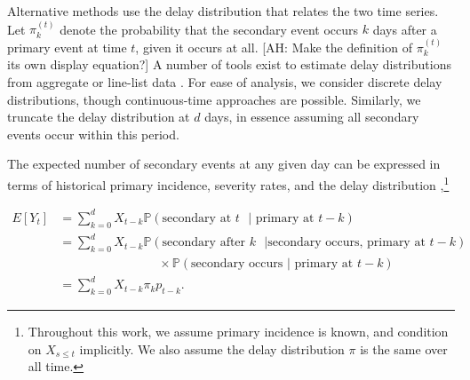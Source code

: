 \documentclass{article}
\newcommand{\ahcomment}[1]{{\color{red}[AH: #1]}}
\begin{document}
Alternative methods use the delay distribution that relates the two time series. Let $\pi_k^{(t)}$ denote the probability that the secondary event occurs $k$ days after a primary event at time $t$, given it occurs at all.  \ahcomment{Make the definition of $\pi_k^{(t)}$ its own display equation?} A number of tools exist to estimate delay distributions from aggregate or line-list data \citep{delay_distrs}. For ease of analysis, we consider discrete delay distributions, though continuous-time approaches are possible. Similarly, we truncate the delay distribution at $d$ days, in essence assuming all secondary events occur within this period. 

The expected number of secondary events at any given day can be expressed in terms of historical primary incidence, severity rates, and the delay distribution \citep{fusedlasso,nishiura},\footnote{Throughout this work, we assume primary incidence is known, and condition on $X_{s\leq t}$ implicitly. We also assume the delay distribution $\pi$ is the same over all time.}

\begin{align}\label{eq:model}
    E[Y_t] &= \sum_{k=0}^d X_{t-k} \mathbb{P}(\text{secondary at $t$ }\vert\text{ primary at }t-k) \nonumber \\ %
            &= \sum_{k=0}^d X_{t-k} \mathbb{P}(\text{secondary after $k$ }\vert\text{secondary occurs, primary at }t-k) \nonumber \\
    &\qquad\qquad\qquad\qquad\times\mathbb{P}(\text{secondary occurs }\vert\text{ primary at $t-k$}) \nonumber \\
    &= \sum_{k=0}^d X_{t-k} \pi_k p_{t-k}.%
\end{align}
\end{document}
